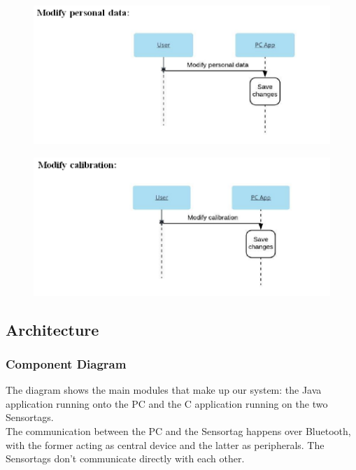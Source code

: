 \documentclass[conference,12pt]{IEEETran}
\begin{document}
\FloatBarrier
\begin{figure}[!h]
	\centering
	\includegraphics[scale=0.4]{images/Seq_Modify.png}
	\label{img:modpersdata}
\end{figure}
\FloatBarrier

\FloatBarrier
\begin{figure}[!h]
	\centering
	\includegraphics[scale=0.4]{images/Seq_Modify_Cal.png}
	\label{img:modcal}
\end{figure}
\FloatBarrier

\subsection{Architecture}
\subsubsection{Component Diagram}

The diagram shows the main modules that make up our system: the Java application running onto the PC and the C application running on the two Sensortags.\\
The communication between the PC and the Sensortag happens over Bluetooth, with the former acting as central device and the latter as peripherals. The Sensortags don’t communicate directly with each other.
\end{document}
